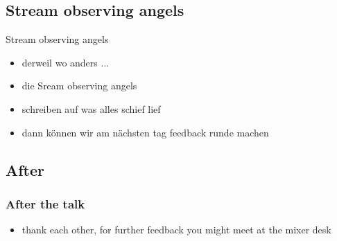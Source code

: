 \documentclass[hyperref={pdfpagelabels=false}]{beamer}
\begin{document}
\subsection{Stream observing angels} %
\begin{frame}{Stream observing angels}
\begin{itemize}
\item  derweil wo anders ...
\item  die Sream observing angels
\item  schreiben auf was alles schief lief
\item  dann können wir am nächsten tag feedback runde machen
\end{itemize} 
\end{frame}

\subsection{After} %
\begin{frame}
\frametitle{After the talk}
\begin{itemize}
\item thank each other, for further feedback you might meet at the mixer desk
\end{itemize} 
\end{frame}

\begin{frame}
\end{frame}
\end{document}
